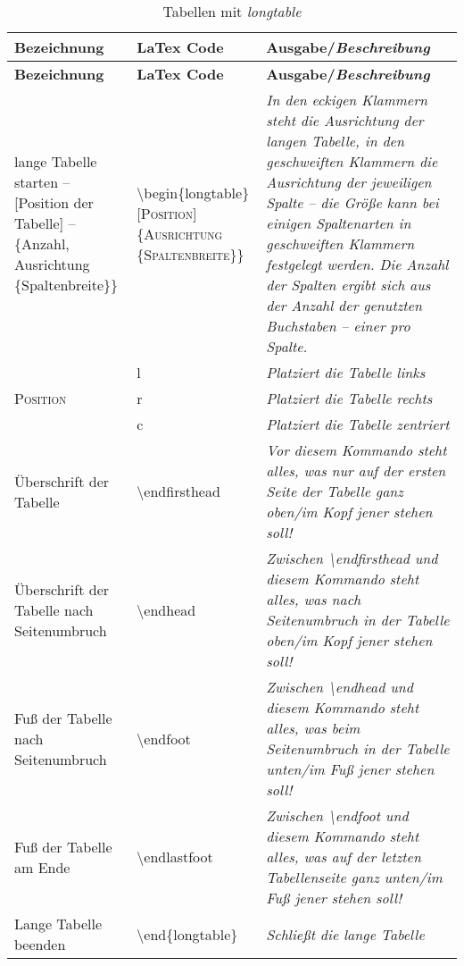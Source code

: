 \renewcommand{\arraystretch}{1.3}
\begin{longtable}[l]{p{}p{}p{}}
\caption{Tabellen mit \emph{longtable}}%
\label{tab: longtable}%
\tabularnewline
 
 \toprule
 \textbf{Bezeichnung} & \textbf{LaTex Code} & \textbf{Ausgabe/\emph{Beschreibung}}\tabularnewline
 \midrule
 \endfirsthead
 
 \toprule
 \textbf{Bezeichnung} & \textbf{LaTex Code} & \textbf{Ausgabe/\emph{Beschreibung}}\tabularnewline
 \midrule
 \endhead
 
 \bottomrule
 \endfoot
 
 \bottomrule
 \endlastfoot
 
lange Tabelle starten -- [Position der Tabelle] -- \{Anzahl, Ausrichtung \{Spaltenbreite\}\} & \textbackslash begin\{longtable\}[\textsc{Position}]\newline
\{\textsc{Ausrichtung\newline
\{Spaltenbreite\}}\} & \textit{In den eckigen Klammern steht die Ausrichtung der langen Tabelle, in den geschweiften Klammern die Ausrichtung der jeweiligen Spalte -- die Größe kann bei einigen Spaltenarten in geschweiften Klammern festgelegt werden. Die Anzahl der Spalten ergibt sich aus der Anzahl der genutzten Buchstaben -- einer pro Spalte.}\tabularnewline
\midrule
\multirow[t]{3}{=}{\textsc{Position}} & l & \textit{Platziert die Tabelle \emph{links}}\tabularnewline
& r & \textit{Platziert die Tabelle \emph{rechts}}\tabularnewline
& c & \textit{Platziert die Tabelle \emph{zentriert}}\tabularnewline
\midrule
Überschrift der Tabelle & \textbackslash endfirsthead & \textit{Vor diesem Kommando steht alles, was nur auf der ersten Seite der Tabelle ganz oben/im Kopf jener stehen soll!}\tabularnewline
Überschrift der Tabelle nach Seitenumbruch & \textbackslash endhead & \textit{Zwischen \textbackslash endfirsthead und diesem Kommando steht alles, was nach Seitenumbruch in der Tabelle oben/im Kopf jener stehen soll!}\tabularnewline
Fuß der Tabelle nach Seitenumbruch & \textbackslash endfoot & \textit{Zwischen \textbackslash endhead und diesem Kommando steht alles, was beim Seitenumbruch in der Tabelle unten/im Fuß jener stehen soll!}\tabularnewline%
Fuß der Tabelle am Ende & \textbackslash endlastfoot & \textit{Zwischen \textbackslash endfoot und diesem Kommando steht alles, was auf der letzten Tabellenseite ganz unten/im Fuß jener stehen soll!}\tabularnewline
Lange Tabelle beenden & \textbackslash end\{longtable\} & \emph{Schließt die lange Tabelle}\tabularnewline%
\end{longtable}%
%
%
